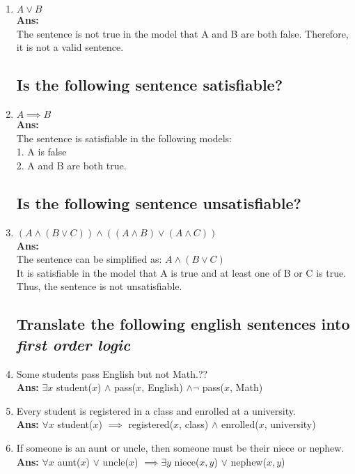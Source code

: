 \documentclass[12pt]{article}
\begin{document}
\begin{enumerate}
\item{\(A \lor B\)}\\
\textbf{Ans:}\\
The sentence is not true in the model that A and B are both false. Therefore, it is not a valid sentence.

\subsection*{Is the following sentence satisfiable?}

\item{\(A \implies B\)}\\
\textbf{Ans:}\\
The sentence is satisfiable in the following models:\\ 
1. A is false\\
2. A and B are both true. 

\subsection*{Is the following sentence unsatisfiable?}

\item{\((A \land (B \lor C)) \land ((A \land B) \lor (A \land C))\)}\\
\textbf{Ans:}\\
The sentence can be simplified as: \(A \land (B \lor C)\)\\
It is satisfiable in the model that A is true and at least one of B or C is true. Thus, the sentence is not unsatisfiable.

\subsection*{Translate the following english sentences into \emph{first order logic}}

\item{Some students pass English but not Math.}??\\
\textbf{Ans:} \(\exists x \) student($x$) \(\land \) pass($x$, English) \(\land \lnot\) pass($x$, Math)

\item{Every student is registered in a class and enrolled at a university.}\\
\textbf{Ans:} \(\forall x\) student($x$) \(\implies\) registered($x$, class) $\land$ enrolled($x$, university)

\item{If someone is an aunt or uncle, then someone must be their niece or nephew.}\\
\textbf{Ans:} $\forall x$ aunt($x$) $\lor$ uncle($x$) $\implies \exists y $ niece($x, y$) $\lor$ nephew($x, y$)


\end{enumerate}
\end{document}
